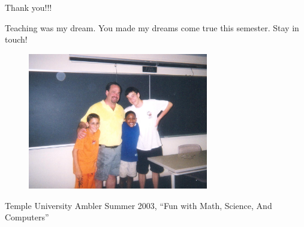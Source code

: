 \documentclass{beamer}
\begin{document}
\begin{frame}{Thank you!!!}

Teaching was my dream.  You made my dreams come true this semester.  Stay in touch!

\begin{figure}[t]
    \includegraphics[width=0.7\textwidth]{christeaching.png}
\end{figure}
\tiny Temple University Ambler Summer 2003, ``Fun with Math, Science, And Computers''

\end{frame}
\end{document}
